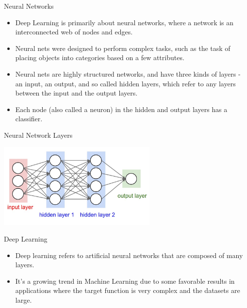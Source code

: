 \documentclass[ignorenonframetext,]{beamer}
\providecommand{\tightlist}{%
\setlength{\itemsep}{0pt}\setlength{\parskip}{0pt}}
\begin{document}
\begin{frame}{Neural Networks}

\begin{itemize}
\tightlist
\item
  Deep Learning is primarily about neural networks, where a network is
  an interconnected web of nodes and edges.
\item
  Neural nets were designed to perform complex tasks, such as the task
  of placing objects into categories based on a few attributes.
\item
  Neural nets are highly structured networks, and have three kinds of
  layers - an input, an output, and so called hidden layers, which refer
  to any layers between the input and the output layers.
\item
  Each node (also called a neuron) in the hidden and output layers has a
  classifier.
\end{itemize}

\end{frame}

\begin{frame}{Neural Network Layers}

\includegraphics[width=300px]{images/neural_networks}

\end{frame}

\begin{frame}{Deep Learning}

\begin{itemize}
\tightlist
\item
  Deep learning refers to artificial neural networks that are composed
  of many layers.
\item
  It's a growing trend in Machine Learning due to some favorable results
  in applications where the target function is very complex and the
  datasets are large.
\end{itemize}

\end{frame}
\end{document}
